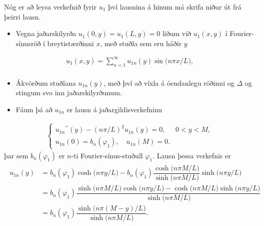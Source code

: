 \documentclass[a4paper,10pt,icelandic]{sphinxmanual}
\begin{document}
Nóg er að leysa verkefnið fyrir \(u_1\) því lausnina á hinum má skrifa niður út frá þeirri lausn.
\begin{itemize}
\item {} 
Vegna jaðarskilyrða \(u_1(0,y)=u_1(L,y)=0\) liðum við \(u_1(x,y)\) í Fourier-sínusröð í breytistærðinni \(x\), með stuðla sem eru háðir \(y\)

\end{itemize}
\begin{equation*}
\begin{split}u_1(x,y)=\sum\limits_{n=1}^\infty u_{1n}(y)\sin\big(n\pi x/L\big), \\\end{split}
\end{equation*}\begin{itemize}
\item {} 
Ákvörðum stuðlana \(u_{1n}(y)\), með því að víxla á óendanlegu röðinni og \(\Delta\) og stingum svo inn jaðarskilyrðunum.

\item {} 
Fáum þá að \(u_{1n}\) er lausn á jaðargildisverkefninu

\end{itemize}
\begin{equation*}
\begin{split}\begin{cases}
 u_{1n}{{^{\prime\prime}}}(y)-(n\pi/L)^2 u_{1n}(y)=0, &0<y<M,\\
 u_{1n}(0)=b_n(\varphi_1), \quad u_{1n}(M)=0.
 \end{cases}\end{split}
\end{equation*}
þar sem \(b_n(\varphi_1)\) er \(n\)-ti Fourier-sínus-stuðull \(\varphi_1\). Lausn þessa verkefnis er
\begin{equation*}
\begin{split}\begin{aligned}
 u_{1n}(y)&=b_n(\varphi_1)\cosh\big(n\pi y/L\big)- b_n(\varphi_1)
 \dfrac{\cosh\big(n\pi M/L\big)}{\sinh\big(n\pi M/L\big)}
 \sinh\big(n\pi y/L\big)\\
 &=b_n(\varphi_1)\dfrac
 {\sinh\big(n\pi M/L\big) \cosh\big(n\pi y/L\big)
 -\cosh\big(n\pi M/L\big) \sinh\big(n\pi y/L\big)}
 {\sinh\big(n\pi M/L\big)}\\
 &=b_n(\varphi_1)\dfrac
 {\sinh\big(n\pi (M-y)/L\big)}
 {\sinh\big(n\pi M/L\big)}.\end{aligned}\end{split}
\end{equation*}
\end{document}
